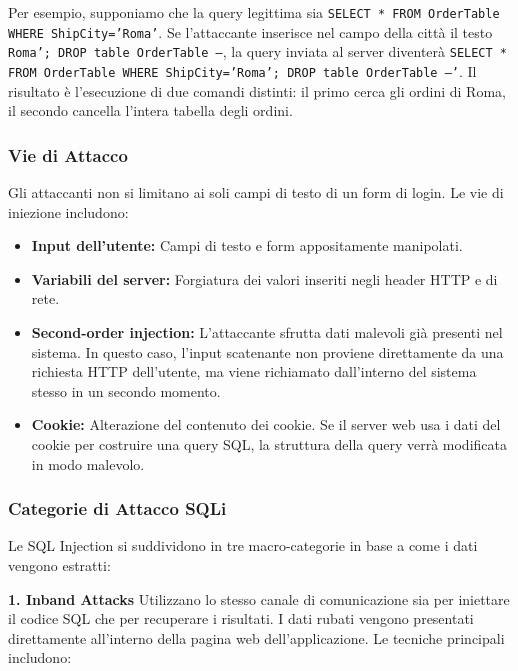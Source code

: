 \documentclass{article}
\begin{document}
Per esempio, supponiamo che la query legittima sia \texttt{SELECT * FROM OrderTable WHERE ShipCity='Roma'}. Se l'attaccante inserisce nel campo della città il testo \texttt{Roma'; DROP table OrderTable --}, la query inviata al server diventerà \texttt{SELECT * FROM OrderTable WHERE ShipCity='Roma'; DROP table OrderTable --'}. Il risultato è l'esecuzione di due comandi distinti: il primo cerca gli ordini di Roma, il secondo cancella l'intera tabella degli ordini.

\subsubsection*{Vie di Attacco}

Gli attaccanti non si limitano ai soli campi di testo di un form di login. Le vie di iniezione includono:

\begin{itemize}
    \item \textbf{Input dell'utente:} Campi di testo e form appositamente manipolati.
    \item \textbf{Variabili del server:} Forgiatura dei valori inseriti negli header HTTP e di rete.
    \item \textbf{Second-order injection:} L'attaccante sfrutta dati malevoli già presenti nel sistema. In questo caso, l'input scatenante non proviene direttamente da una richiesta HTTP dell'utente, ma viene richiamato dall'interno del sistema stesso in un secondo momento.
    \item \textbf{Cookie:} Alterazione del contenuto dei cookie. Se il server web usa i dati del cookie per costruire una query SQL, la struttura della query verrà modificata in modo malevolo.
\end{itemize}

\subsubsection*{Categorie di Attacco SQLi}

Le SQL Injection si suddividono in tre macro-categorie in base a come i dati vengono estratti:

\vspace{0.3cm}
\noindent \textbf{1. Inband Attacks}
Utilizzano lo stesso canale di comunicazione sia per iniettare il codice SQL che per recuperare i risultati. I dati rubati vengono presentati direttamente all'interno della pagina web dell'applicazione. Le tecniche principali includono:
\end{document}
